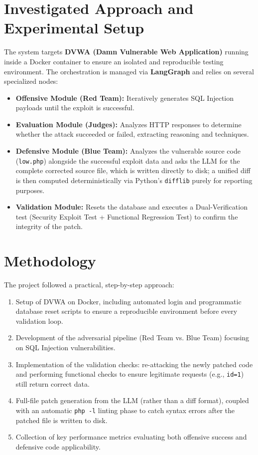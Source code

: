 \documentclass[11pt,a4paper]{article}
\begin{document}
\section{Investigated Approach and Experimental Setup}
The system targets \textbf{DVWA (Damn Vulnerable Web Application)} running inside a Docker container to ensure an isolated and reproducible testing environment. The orchestration is managed via \textbf{LangGraph} and relies on several specialized nodes:
\begin{itemize}
    \item \textbf{Offensive Module (Red Team):} Iteratively generates SQL Injection payloads until the exploit is successful.
    \item \textbf{Evaluation Module (Judges):} Analyzes HTTP responses to determine whether the attack succeeded or failed, extracting reasoning and techniques.
    \item \textbf{Defensive Module (Blue Team):} Analyzes the vulnerable source code (\texttt{low.php}) alongside the successful exploit data and asks the LLM for the complete corrected source file, which is written directly to disk; a unified diff is then computed deterministically via Python's \texttt{difflib} purely for reporting purposes.
    \item \textbf{Validation Module:} Resets the database and executes a Dual-Verification test (Security Exploit Test + Functional Regression Test) to confirm the integrity of the patch.
\end{itemize}

\section{Methodology}
The project followed a practical, step-by-step approach:
\begin{enumerate}
    \item Setup of DVWA on Docker, including automated login and programmatic database reset scripts to ensure a reproducible environment before every validation loop.
    \item Development of the adversarial pipeline (Red Team vs. Blue Team) focusing on SQL Injection vulnerabilities.
    \item Implementation of the validation checks: re-attacking the newly patched code and performing functional checks to ensure legitimate requests (e.g., \texttt{id=1}) still return correct data.
    \item Full-file patch generation from the LLM (rather than a diff format), coupled with an automatic \texttt{php -l} linting phase to catch syntax errors after the patched file is written to disk.
    \item Collection of key performance metrics evaluating both offensive success and defensive code applicability.
\end{enumerate}
\end{document}
